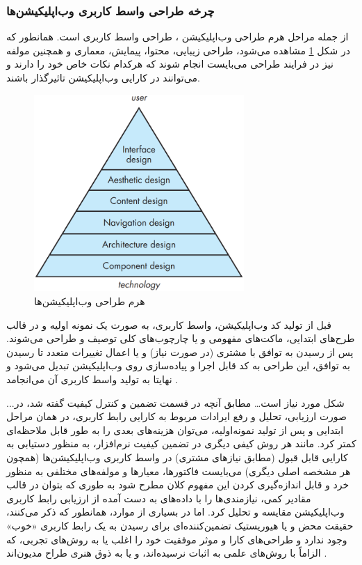 \documentclass{article}
\theoremstyle{definition}
\begin{document}
\subsubsection{چرخه طراحی واسط کاربری وب‌اپلیکیشن‌ها}
از جمله مراحل هرم طراحی وب‌اپلیکیشن
\cite{pressman}
، طراحی واسط کاربری است.  همانطور که در شکل
\ref{pyramid}
مشاهده می‌شود، طراحی زیبایی، محتوا، پیمایش، معماری و همچنین مولفه نیز در فرایند طراحی می‌بایست انجام شوند که هرکدام نکات خاص خود را دارند و می‌توانند در کارایی وب‌اپلیکیشن تاثیرگذار باشند.
\begin{figure}[H]
	\centering\includegraphics[width=8cm]{Resources/pyramid.PNG}
	\caption{هرم طراحی وب‌اپلیکیشن‌ها
	\cite{pressman}
	}
	\label{pyramid}
\end{figure}
قبل از تولید کد وب‌اپلیکیشن، واسط کاربری، به صورت یک نمونه اولیه و در قالب طرح‌های ابتدایی، ماکت‌های مفهومی و یا چارچوب‌های کلی توصیف و طراحی می‌شوند. پس از رسیدن به توافق با مشتری (در صورت نیاز) و یا اعمال تغییرات متعدد تا رسیدن به توافق، این طراحی به کد قابل اجرا و پیاده‌سازی روی وب‌اپلیکیشن تبدیل می‌شود و نهایتا به تولید واسط کاربری آن می‌انجامد
\cite{sommerville}.

...شکل مورد نیاز است…
مطابق آنچه در قسمت تضمین و کنترل کیفیت گفته شد، در صورت ارزیابی، تحلیل و رفع ایرادات مربوط به کارایی رابط کاربری، در همان مراحل ابتدایی و پس از تولید نمونه‌اولیه، می‌توان هزینه‌های بعدی را به طور قابل ملاحظه‌ای کمتر کرد.
مانند هر روش کیفی دیگری در تضمین کیفیت نرم‌افزار، به منظور دستیابی به کارایی قابل قبول (مطابق نیازهای مشتری) در واسط کاربری وب‌اپلیکیشن‌ها (همچون هر مشخصه اصلی دیگری) می‌بایست فاکتورها، معیارها و مولفه‌های مختلفی به منظور خرد و قابل اندازه‌گیری کردن این مفهوم کلان مطرح شود به طوری که بتوان در قالب مقادیر کمی، نیازمندی‌ها را با داده‌های به دست آمده از ارزیابی رابط کاربری وب‌اپلیکیشن مقایسه و تحلیل کرد. اما در بسیاری از موارد، همانطور که
\cite{assesing, main2}
ذکر می‌کنند، حقیقت محض و یا هیوریستیک تضمین‌کننده‌ای برای رسیدن به یک رابط کاربری «خوب» وجود ندارد و طراحی‌های کارا و موثر موفقیت خود را اغلب یا به روش‌های تجربی، که الزاماً با روش‌های علمی به اثبات نرسیده‌اند، و یا به ذوق هنری طراح مدیون‌اند
\cite{measuring}.
\end{document}
